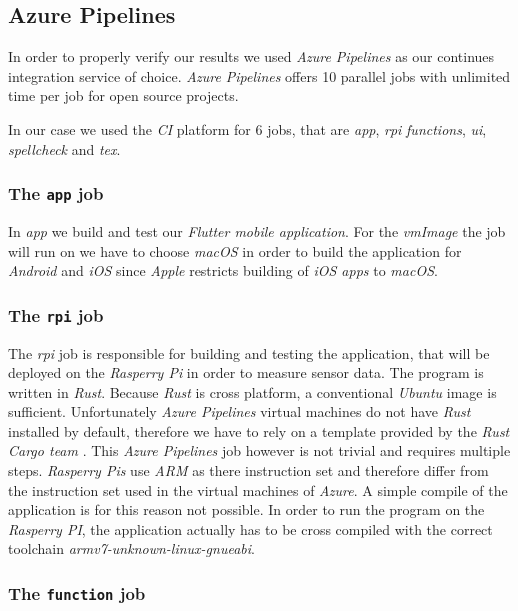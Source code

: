 \subsection{Azure Pipelines}

In order to properly verify our results we used \textit{Azure Pipelines} as our continues
integration service of choice. \textit{Azure Pipelines} offers 10 parallel jobs with unlimited time
per job for open source projects. \cite{azure-pipelines-devop}

In our case we used the \textit{CI} platform for 6 jobs, that are \textit{app}, \textit{rpi}
\textit{functions}, \textit{ui}, \textit{spellcheck} and \textit{tex}.

\subsubsection{The \texttt{app} job}

In \textit{app} we build and test our \textit{Flutter mobile application}. For the \textit{vmImage}
the job will run on we have to choose \textit{macOS} in order to build the application for
\textit{Android} and \textit{iOS} since \textit{Apple} restricts building of \textit{iOS apps} to
\textit{macOS}.

\subsubsection{The \texttt{rpi} job}

The \textit{rpi} job is responsible for building and testing the application, that will be deployed
on the \textit{Rasperry Pi} in order to measure sensor data. The program is written in
\textit{Rust}. Because \textit{Rust} is cross platform, a conventional \textit{Ubuntu} image is
sufficient. Unfortunately \textit{Azure Pipelines} virtual machines do not have \textit{Rust}
installed by default, therefore we have to rely on a template provided by the \textit{Rust Cargo
team} \cite{rust-cargo}. This \textit{Azure Pipelines} job however is not trivial and requires
multiple steps. \textit{Rasperry Pis} use \textit{ARM} as there instruction set and therefore differ
from the instruction set used in the virtual machines of \textit{Azure}. A simple compile of the
application is for this reason not possible. In order to run the program on the \textit{Rasperry
PI}, the application actually has to be cross compiled with the correct toolchain
\textit{armv7-unknown-linux-gnueabi}.

\subsubsection{The \texttt{function} job}
\label{sec:azure-function}

